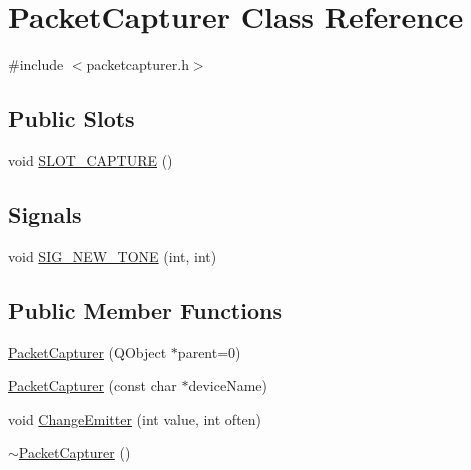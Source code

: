 \hypertarget{class_packet_capturer}{\section{Packet\-Capturer Class Reference}
\label{class_packet_capturer}
}


{\ttfamily \#include $<$packetcapturer.\-h$>$}

\subsection*{Public Slots}
\begin{DoxyCompactItemize}
\item 
void \hyperlink{class_packet_capturer_a3f008c97baedf3417013623b05b0de34}{S\-L\-O\-T\-\_\-\-C\-A\-P\-T\-U\-R\-E} ()
\end{DoxyCompactItemize}
\subsection*{Signals}
\begin{DoxyCompactItemize}
\item 
void \hyperlink{class_packet_capturer_a010699f00f58d9135c95eb358e40889b}{S\-I\-G\-\_\-\-N\-E\-W\-\_\-\-T\-O\-N\-E} (int, int)
\end{DoxyCompactItemize}
\subsection*{Public Member Functions}
\begin{DoxyCompactItemize}
\item 
\hyperlink{class_packet_capturer_a9318e16609d0662061b09e4f80984160}{Packet\-Capturer} (Q\-Object $\ast$parent=0)
\item 
\hyperlink{class_packet_capturer_a39bf6aec9827c081c90f90facc428a26}{Packet\-Capturer} (const char $\ast$device\-Name)
\item 
void \hyperlink{class_packet_capturer_a4df4e57d6ad6d62bf48f3e7a421a98d0}{Change\-Emitter} (int value, int often)
\item 
\hyperlink{class_packet_capturer_af5e2c8ad13949df4673c675a05e50219}{$\sim$\-Packet\-Capturer} ()
\end{DoxyCompactItemize}


